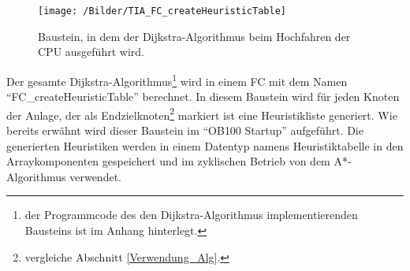 			\begin{figure}[h]
				\centering
				\texttt{[image: /Bilder/TIA\_FC\_createHeuristicTable]}
				\vspace{0.2cm}
				\caption{Baustein, in dem der Dijkstra-Algorithmus beim Hochfahren der CPU ausgeführt wird.}
				
			\end{figure}
			Der gesamte Dijkstra-Algorithmus\footnote{der Programmcode des den Dijkstra-Algorithmus implementierenden Bausteins ist im Anhang hinterlegt.} wird in einem \ac{FC} mit dem Namen "`FC\_createHeuristicTable"' berechnet. In diesem Baustein wird für jeden Knoten der Anlage, der als Endzielknoten\footnote{vergleiche Abschnitt \ref{Verwendung_Alg}.} markiert ist eine Heuristikliste generiert. Wie bereits erwähnt wird dieser Baustein im "`\ac{OB}100 Startup"' aufgeführt. Die generierten Heuristiken werden in einem Datentyp namens Heuristiktabelle in den Arraykomponenten gespeichert und im zyklischen Betrieb von dem A*-Algorithmus verwendet. 
		
			

